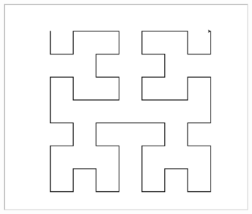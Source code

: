 \documentclass[11pt,class=report,crop=false]{standalone}
\begin{document}
\begin{activite}
\begin{enumerate}
\begin{center}
\includegraphics[scale=\myscale,scale=0.14]{ecran_tortue_hilbert3}


\end{center}
\end{enumerate}
\end{activite}
\end{document}
